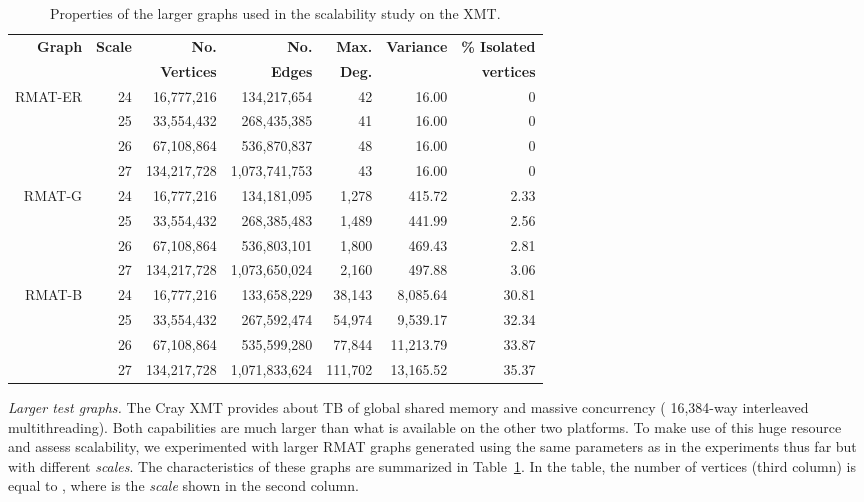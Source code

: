 \documentclass{article}
\begin{document}
\begin{table}
\begin{footnotesize}
\centering
\begin{tabular}{|r|r|r|r|r|r|r|}
\hline
\textbf{Graph}	& \textbf{Scale}	&	\textbf{No. }	&	\textbf{No. }	&	\textbf{Max.}	&	
                   \textbf{Variance}	&	\textbf{\% Isolated}	\\  
& &\textbf{Vertices}	& \textbf{Edges} &	\textbf{Deg.}	& &	\textbf{vertices}	\\ \hline \hline                   
\multirow{4}{*}{RMAT-ER} & 24	&	 16,777,216 	&	 134,217,654 	&	 42 		&	 16.00 		& 0	\\ 
& 25	&	 33,554,432 	&	 268,435,385 	&	 41 		&	 16.00 		& 0   	\\ 
& 26	&	 67,108,864 	&	 536,870,837 	&	 48 		&	 16.00 		& 0   	\\ 
& 27	&	 134,217,728 	&	 1,073,741,753 	&	 43 		&	 16.00 		& 0   	\\ \hline
\multirow{4}{*}{RMAT-G}	& 24	&	 16,777,216 	&	 134,181,095 	&	 1,278 		&	 415.72 	& 2.33 	\\ 
& 25	&	 33,554,432 	&	 268,385,483 	&	 1,489 		&	 441.99 	& 2.56 	\\ 
& 26	&	 67,108,864 	&	 536,803,101 	&	 1,800 		&	 469.43 	& 2.81 	\\ 
& 27	&	 134,217,728 	&	 1,073,650,024 	&	 2,160 		&	 497.88 	& 3.06 	\\ \hline
\multirow{4}{*}{RMAT-B} & 24	&	 16,777,216 	&	 133,658,229 	&	 38,143 	&	 8,085.64 	& 30.81 \\ 
& 25	&	 33,554,432 	&	 267,592,474 	&	 54,974 	&	 9,539.17 	& 32.34 \\ 
& 26	&	 67,108,864 	&	 535,599,280 	&	 77,844 	&	 11,213.79 	& 33.87 \\ 
& 27	&	 134,217,728 	&	 1,071,833,624 	&	 111,702 	&	 13,165.52 	& 35.37 \\ \hline
\end{tabular}
\caption{\small Properties of the larger graphs used in the scalability study on the XMT.}
\label{t:LargeScale}
\end{footnotesize}
\end{table}

{\em Larger test graphs. } 
The Cray XMT provides about  TB of global shared memory and
massive  concurrency ( 16,384-way interleaved multithreading).
Both capabilities are much larger than what is available on the other two platforms.
To make use of this huge resource and assess scalability, 
we experimented with larger RMAT graphs generated using the same parameters as
in the experiments thus far but with different {\em scales}.
The characteristics of these graphs are summarized in Table~\ref{t:LargeScale}. 
In the table, the number of vertices (third column) is equal to , where  is the {\em scale}
shown in the second column.
\end{document}
